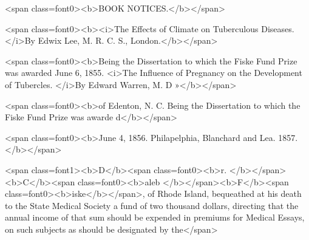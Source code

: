 <span class=font0><b>BOOK NOTICES.</b></span>

<span class=font0><b><i>The Effects of Climate on Tuberculous Diseases.   </i>By Edwix Lee, M. R. C. S., London.</b></span>

<span class=font0><b>Being the Dissertation to which the Fiske Fund Prize was awarded June 6, 1855.
<i>The Influence of Pregnancy on the Development of Tubercles.   </i>By Edward Warren, M. D »</b></span>

<span class=font0><b>of Edenton, N. C.   Being the Dissertation to which the Fiske Fund Prize was awarde d</b></span>

<span class=font0><b>June 4, 1856.   Philapelphia, Blanchard and Lea. 1857.</b></span>

<span class=font1><b>D</b><span class=font0><b>r. </b></span><b>C</b><span class=font0><b>aleb </b></span><b>F</b><span class=font0><b>iske</b></span>, of Rhode Island, bequeathed at his death to the
State Medical Society a fund of two thousand dollars, directing that
the annual income of that sum should be expended in premiums for
Medical Essays, on such subjects as should be designated by the</span>
